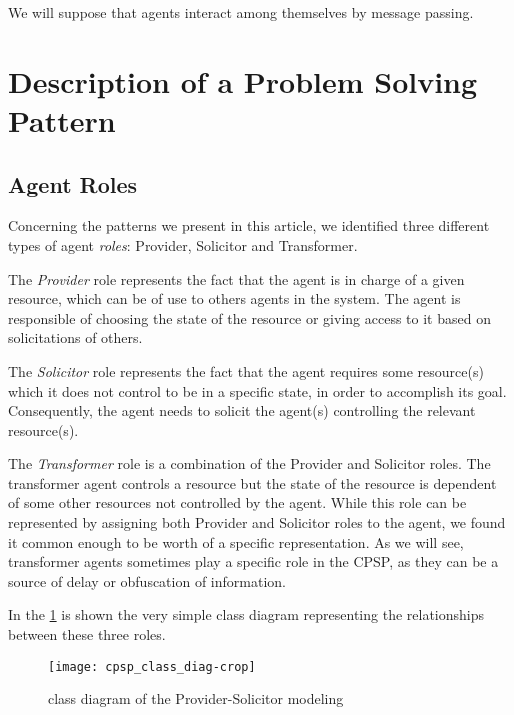 We will suppose that agents interact among themselves by message passing.

\section{Description of a Problem Solving Pattern}


\subsection{Agent Roles}

Concerning the patterns we present in this article, we identified three different types of agent \emph{roles}: Provider, Solicitor and Transformer.

The \emph{Provider} role represents the fact that the agent is in charge of a given resource, which can be of use to others agents in the system. The agent is responsible of choosing the state of the resource or giving access to it based on solicitations of others.

The \emph{Solicitor} role represents the fact that the agent requires some resource(s) which it does not control to be in a specific state, in order to accomplish its goal. Consequently, the agent needs to solicit the agent(s) controlling the relevant resource(s).

The \emph{Transformer} role is a combination of the Provider and Solicitor roles. The transformer agent controls a resource but the state of the resource is dependent of some other resources not controlled by the agent. While this role can be represented by assigning both Provider and Solicitor roles to the agent, we found it common enough to be worth of a specific representation. As we will see, transformer agents sometimes play a specific role in the CPSP, as they can be a source of delay or obfuscation of information.

In the \figurename{} \ref{cpsp_class_diag} is shown the very simple class diagram representing the relationships between these three roles.

\begin{figure}
\centering
\texttt{[image: cpsp\_class\_diag-crop]}
\caption{class diagram of the Provider-Solicitor modeling}
\label{cpsp_class_diag}
\end{figure}

